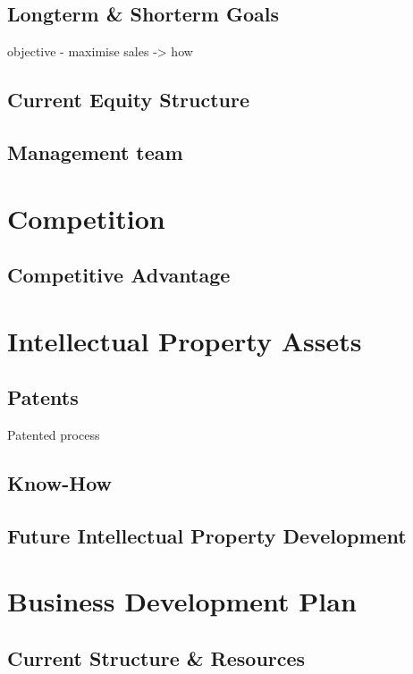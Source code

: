 \documentclass{article}
\begin{document}
  \subsection{Longterm & Shorterm Goals}

    objective - maximise sales -> how


  \subsection{Current Equity Structure}

  \subsection{Management team}


\section{Competition}
  \subsection{Competitive Advantage}

\section{Intellectual Property Assets}

  \subsection{Patents}
    Patented process

  \subsection{Know-How}

  \subsection{Future Intellectual Property Development}

\section{Business Development Plan}

  \subsection{Current Structure & Resources}
\end{document}
